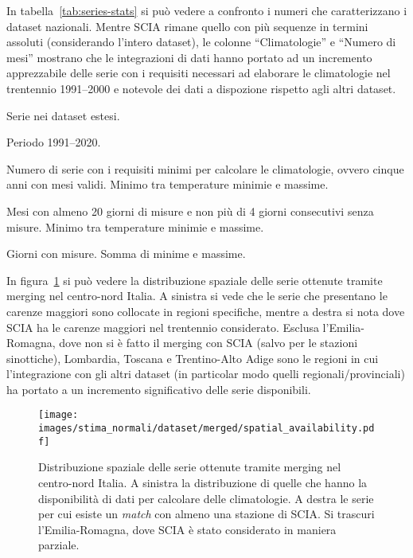 In tabella~\ref{tab:series-stats} si può vedere a confronto i numeri che caratterizzano i dataset nazionali. Mentre SCIA rimane quello con più sequenze in termini assoluti (considerando l'intero dataset), le colonne ``Climatologie'' e ``Numero di mesi'' mostrano che le integrazioni di dati hanno portato ad un incremento apprezzabile delle serie con i requisiti necessari ad elaborare le climatologie nel trentennio 1991--2000 e notevole dei dati a dispozione rispetto agli altri dataset.
\begin{table}[ht]
  \centering
  \begin{threeparttable}
    \caption{Serie nei dataset estesi.}\label{tab:series-stats}
    \scriptsize
    
    \begin{tablenotes}
    \item [*] Periodo 1991--2020.
    \item [1] Numero di serie con i requisiti minimi per calcolare le climatologie, ovvero cinque anni con mesi validi. Minimo tra temperature minimie e massime.
    \item [2] Mesi con almeno 20 giorni di misure e non più di 4 giorni consecutivi senza misure. Minimo tra temperature minimie e massime.
    \item [3] Giorni con misure. Somma di minime e massime.
    \end{tablenotes}
  \end{threeparttable}
\end{table}

In figura~\ref{fig:merged-series} si può vedere la distribuzione spaziale delle serie ottenute tramite merging nel centro-nord Italia. A sinistra si vede che le serie che presentano le carenze maggiori sono collocate in regioni specifiche, mentre a destra si nota dove SCIA ha le carenze maggiori nel trentennio considerato. Esclusa l'Emilia-Romagna, dove non si è fatto il merging con SCIA (salvo per le stazioni sinottiche), Lombardia, Toscana e Trentino-Alto Adige sono le regioni in cui l'integrazione con gli altri dataset (in particolar modo quelli regionali/provinciali) ha portato a un incremento significativo delle serie disponibili.
\begin{figure}[ht]
  \centering
  \texttt{[image: images/stima\_normali/dataset/merged/spatial\_availability.pdf]}
  \caption{Distribuzione spaziale delle serie ottenute tramite merging nel centro-nord Italia. A sinistra la distribuzione di quelle che hanno la disponibilità di dati per calcolare delle climatologie. A destra le serie per cui esiste un \emph{match} con almeno una stazione di SCIA. Si trascuri l'Emilia-Romagna, dove SCIA è stato considerato in maniera parziale.}\label{fig:merged-series}
\end{figure}

